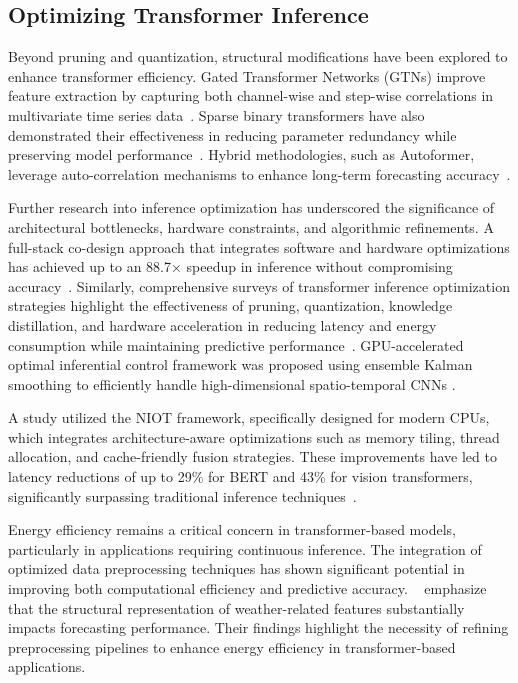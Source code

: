\subsection{Optimizing Transformer Inference}

Beyond pruning and quantization, structural modifications have been explored to enhance transformer efficiency. Gated Transformer Networks (GTNs) improve feature extraction by capturing both channel-wise and step-wise correlations in multivariate time series data~\cite{Liu2021}. Sparse binary transformers have also demonstrated their effectiveness in reducing parameter redundancy while preserving model performance~\cite{Gorbett2023}. Hybrid methodologies, such as Autoformer, leverage auto-correlation mechanisms to enhance long-term forecasting accuracy~\cite{Wu2021}.

Further research into inference optimization has underscored the significance of architectural bottlenecks, hardware constraints, and algorithmic refinements. A full-stack co-design approach that integrates software and hardware optimizations has achieved up to an 88.7× speedup in inference without compromising accuracy~\cite{kim2023stackoptimizationtransformerinference}. Similarly, comprehensive surveys of transformer inference optimization strategies highlight the effectiveness of pruning, quantization, knowledge distillation, and hardware acceleration in reducing latency and energy consumption while maintaining predictive performance~\cite{chitty2023survey}.
GPU-accelerated optimal inferential control framework was proposed using ensemble Kalman smoothing to efficiently handle high-dimensional spatio-temporal CNNs \cite{vaziri2024optimalinferentialcontrolconvolutional}.

A study utilized the NIOT framework, specifically designed for modern CPUs, which integrates architecture-aware optimizations such as memory tiling, thread allocation, and cache-friendly fusion strategies. These improvements have led to latency reductions of up to 29\% for BERT \cite{devlin2019bert} and 43\% for vision transformers, significantly surpassing traditional inference techniques~\cite{zhang2023niot}.



Energy efficiency remains a critical concern in transformer-based models, particularly in applications requiring continuous inference. The integration of optimized data preprocessing techniques has shown significant potential in improving both computational efficiency and predictive accuracy. ~\cite{10.1016/j.ijinfomgt.2020.102282} emphasize that the structural representation of weather-related features substantially impacts forecasting performance. Their findings highlight the necessity of refining preprocessing pipelines to enhance energy efficiency in transformer-based applications.

